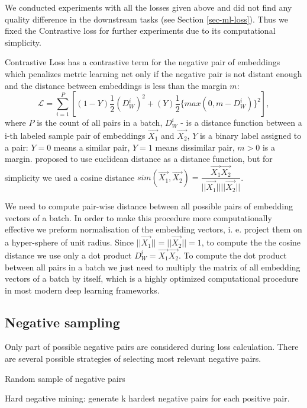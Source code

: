 \documentclass[sigconf]{acmart}
\begin{document}
We conducted experiments with all the losses given above and did not find any quality difference in the downstream tasks (see Section \ref{sec-ml-loss}). Thus we fixed the Contrastive loss for further experiments due to its computational simplicity.

Contrastive Loss has a contrastive term for the negative pair of embeddings which penalizes metric learning net only if the negative pair is not distant enough and the distance between embeddings is less than the margin $m$:  
\begin{equation}
 \mathcal{L} = \sum_{i=1}^P \left[ (1-Y)\dfrac{1}{2}(D_W^i)^2 +(Y)\dfrac{1}{2}\{max(0,m-D_W^i)\}^2 \right],
\end{equation}
where $P$ is the count of all pairs in a batch, $D_W^i$ - is a distance function between a i-th labeled sample pair of embeddings $\vec{X_1}$ and $\vec{X_2}$, 
$Y$ is a binary label assigned to a pair: $Y = 0$ means a similar pair, $Y = 1$ means dissimilar pair, $m > 0$ is a margin.
\cite{Hadsell:2006:DRL:1153171.1153654} proposed to use euclidean distance as a distance function, but for simplicity we used a cosine distance $sim(\vec{X_1},\vec{X_2})=\dfrac{\vec{X_1}\vec{X_2}}{||\vec{X_1}|| ||\vec{X_2}||}$.

We need to compute pair-wise distance between all possible pairs of embedding vectors of a batch. In order to make this procedure more computationally effective we preform normalisation of the embedding vectors, i. e. project them on a hyper-sphere of unit radius. Since $||\vec{X_1}||= ||\vec{X_2}||=1$, to compute the the cosine distance we use only a dot product $D_W^i =\vec{X_1}\vec{X_2}$. To compute the dot product between all pairs in a batch we just need to multiply the matrix of all embedding vectors of a batch by itself, which is a highly optimized computational procedure in most modern deep learning frameworks.

\subsection{Negative sampling} \label{sec-neg-samples}

Only part of possible negative pairs are considered during loss calculation. There are several possible strategies of selecting most relevant negative pairs.

Random sample of negative pairs

Hard negative mining: generate k hardest negative pairs for each positive pair.
\end{document}
